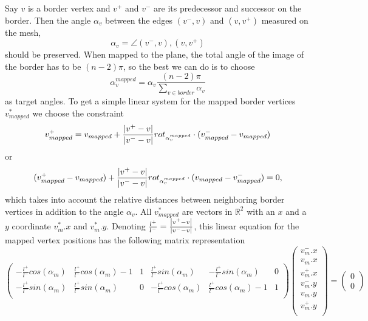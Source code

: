 Say $v$ is a border vertex and $v^+$ and $v^-$ are its predecessor and successor on the border. Then the angle $\alpha_v$ between the edges $(v^-,v)$ and $(v,v^+)$ measured on the mesh,
\[\alpha_v = \angle (v^-,v),(v,v^+)\]
should be preserved. When mapped to the plane, the total angle of the image of the border has to be $(n-2)\pi$, so the best we can do is to choose
\begin{equation}\alpha_v^{mapped} = \alpha_v \frac{(n-2) \pi}{\sum_{v \in border} \alpha_v}\label{eq:conformalAngles}\end{equation}
as target angles. To get a simple linear system for the mapped border vertices $v_{mapped}^*$ we choose the constraint
\begin{equation} v^+_{mapped} = v_{mapped} + \frac{\left| v^+-v \right|}{\left| v^- -v \right|}rot_{\alpha_v^{mapped}} \cdot (v_{mapped}^- - v_{mapped})\label{eq:conformalBorder}\end{equation}
or
\[ (v^+_{mapped}-v_{mapped} ) + \frac{\left| v^+-v \right|}{\left| v^- -v \right|}rot_{\alpha_v^{mapped}} \cdot (v_{mapped} - v_{mapped}^- )= 0,\]
which takes into account the relative distances between neighboring border vertices in addition to the angle $\alpha_v$. All $v_{mapped}^*$ are vectors in $\mathbb R^2$ with an $x$ and a $y$ coordinate $v_m^*.x$ and $v_m^*.y$. Denoting $\frac{l^+}{l^-} = \frac{\left| v^+-v \right|}{\left| v^- -v \right|}$, this linear equation for the mapped vertex positions has the following matrix representation
\[\begin{pmatrix}
-\frac{l^+}{l^-}cos(\alpha_{m})& \frac{l^+}{l^-}cos(\alpha_{m}) -1 & 1 & \frac{l^+}{l^-}sin(\alpha_{m}) & -\frac{l^+}{l^-}sin(\alpha_{m}) & 0\\
-\frac{l^+}{l^-}sin(\alpha_{m}) & \frac{l^+}{l^-}sin(\alpha_{m})  & 0  & - \frac{l^+}{l^-}cos(\alpha_{m}) & \frac{l^+}{l^-}cos(\alpha_{m}) -1 & 1\\
 
\end{pmatrix} \begin{pmatrix}
v_{m}^-.x \\
v_{m}.x \\
v_{m}^+.x \\
v_{m}^-.y \\
v_{m}.y \\
v_{m}^+.y \\
\end{pmatrix} = \begin{pmatrix}
0 \\
0
\end{pmatrix}\]


